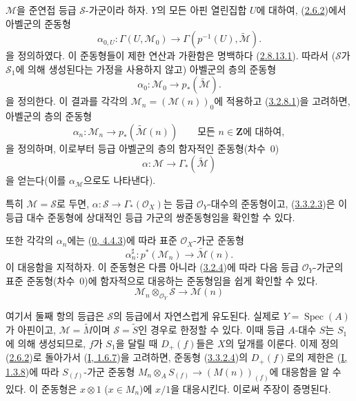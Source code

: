 \begin{env}[3.3.2]
\label{II.3.3.2-ko}
$\mathcal{M}$을 준연접 등급 $\mathcal{S}$-가군이라 하자. $Y$의 모든
아핀 열린집합 $U$에 대하여, (\hyperref[II.2.6.2-ko]{2.6.2})에서
아벨군의 준동형
\[
  \alpha_{0,U}:\Gamma(U,\mathcal{M}_0)
  \longrightarrow\Gamma(p^{-1}(U),\widetilde{\mathcal{M}}).
\]
을 정의하였다. 이 준동형들이 제한 연산과 가환함은 명백하다
(\hyperref[II.2.8.13.1-ko]{2.8.13.1}). 따라서 ($\mathcal{S}$가
$\mathcal{S}_1$에 의해 생성된다는 가정을 사용하지 않고) 아벨군의 층의
준동형
\[
\label{II.3.3.2.1-ko}
  \alpha_0:\mathcal{M}_0\longrightarrow p_*(\widetilde{\mathcal{M}}).
\tag{3.3.2.1}
\]
을 정의한다. 이 결과를 각각의
$\mathcal{M}_n=(\mathcal{M}(n))_0$에 적용하고
(\hyperref[II.3.2.8.1-ko]{3.2.8.1})을 고려하면, 아벨군의 층의 준동형
\[
\label{II.3.3.2.2-ko}
  \alpha_n:\mathcal{M}_n\longrightarrow
  p_*(\widetilde{\mathcal{M}}(n))
  \qquad\text{모든 }n\in\mathbf{Z}\text{에 대하여},
\tag{3.3.2.2}
\]
을 정의하며, 이로부터 등급 아벨군의 층의 함자적인 준동형(차수~$0$)
\[
\label{II.3.3.2.3-ko}
  \alpha:\mathcal{M}\longrightarrow\Gamma_*(\widetilde{\mathcal{M}})
\tag{3.3.2.3}
\]
을 얻는다(이를 $\alpha_{\mathcal{M}}$으로도 나타낸다).

특히 $\mathcal{M}=\mathcal{S}$로 두면,
$\alpha:\mathcal{S}\to\Gamma_*(\mathcal{O}_X)$는 등급
$\mathcal{O}_Y$-대수의 준동형이고,
(\hyperref[II.3.3.2.3-ko]{3.3.2.3})은 이 등급 대수 준동형에 상대적인
등급 가군의 쌍준동형임을 확인할 수 있다.

또한 각각의 $\alpha_n$에는 (\hyperref[0.4.4.3-ko]{0, 4.4.3})에 따라
표준 $\mathcal{O}_X$-가군 준동형
\[
\label{II.3.3.2.4-ko}
  \alpha_n^\sharp:p^*(\mathcal{M}_n)
  \longrightarrow\widetilde{\mathcal{M}}(n).
\tag{3.3.2.4}
\]
이 대응함을 지적하자. 이 준동형은 다름 아니라
(\hyperref[II.3.2.4-ko]{3.2.4})에 따라 다음 등급
$\mathcal{O}_Y$-가군의 표준 준동형(차수~$0$)에 함자적으로 대응하는
준동형임을 쉽게 확인할 수 있다.
\[
\label{II.3.3.2.5-ko}
  \mathcal{M}_n\otimes_{\mathcal{O}_Y}\mathcal{S}
  \longrightarrow\mathcal{M}(n)
\tag{3.3.2.5}
\]


여기서 둘째 항의 등급은 $\mathcal{S}$의 등급에서 자연스럽게 유도된다.
실제로 $Y=\operatorname{Spec}(A)$가 아핀이고,
$\mathcal{M}=\widetilde{M}$이며 $\mathcal{S}=\widetilde{S}$인 경우로
한정할 수 있다. 이때 등급 $A$-대수 $S$는 $S_1$에 의해 생성되므로,
$f$가 $S_1$을 달릴 때 $D_+(f)$들은 $X$의 덮개를 이룬다. 이제 정의
(\hyperref[II.2.6.2-ko]{2.6.2})로 돌아가서
(\hyperref[I.1.6.7-ko]{I, 1.6.7})을 고려하면, 준동형
(\hyperref[II.3.3.2.4-ko]{3.3.2.4})의 $D_+(f)$로의 제한은
(\hyperref[I.1.3.8-ko]{I, 1.3.8})에 따라 $S_{(f)}$-가군 준동형
$M_n\otimes_A S_{(f)}\to(M(n))_{(f)}$에 대응함을 알 수 있다. 이 준동형은
$x\otimes1$ ($x\in M_n$)에 $x/1$을 대응시킨다. 이로써 주장이 증명된다.
\end{env}

